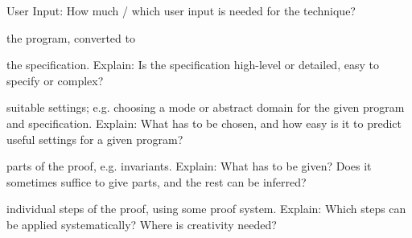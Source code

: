 \documentclass[a4paper]{article}
\begin{document}
\begin{minipage}[t]{0.16\linewidth}
\begin{betterlist}
\begin{betterlist}
		\end{betterlist}
		\item \alert{User Input:} How much / which user input is needed for the technique?
		\begin{betterlist}
			\item \checkboxChecked the program, converted to

			\item \checkboxHalfChecked the specification. Explain: Is the specification high-level or detailed, easy to specify or complex?

			\item \checkboxUnchecked suitable settings; e.g. choosing a mode or abstract domain for the given program and specification. Explain: What has to be chosen, and how easy is it to predict useful settings for a given program?

			\item \checkboxUnchecked parts of the proof, e.g. invariants. Explain: What has to be given? Does it sometimes suffice to give parts, and the rest can be inferred?

			\item \checkboxUnchecked individual steps of the proof, using some proof system. Explain: Which steps can be applied systematically? Where is creativity needed?


\end{betterlist}
\end{betterlist}
\end{minipage}
\end{document}
